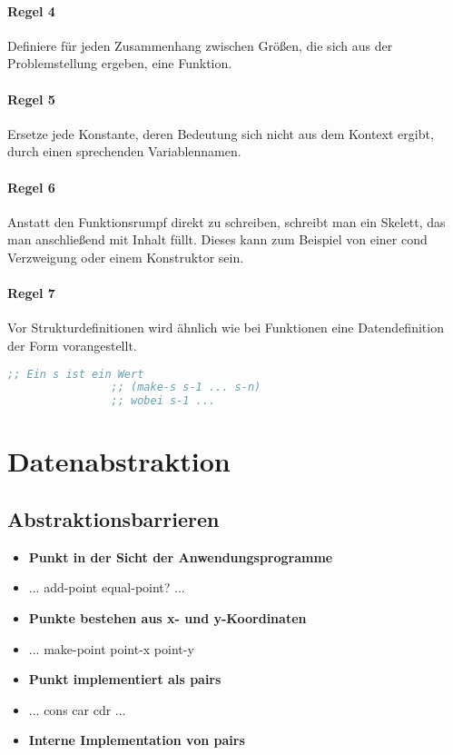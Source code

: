 \documentclass[../main.tex]{subfiles}
\begin{document}
        \paragraph{Regel 4}
            Definiere für jeden Zusammenhang zwischen Größen, die sich aus der Problemstellung ergeben, eine Funktion.
            
        \paragraph{Regel 5}
            Ersetze jede Konstante, deren Bedeutung sich nicht aus dem Kontext ergibt, durch einen sprechenden Variablennamen.
            
        \paragraph{Regel 6}
            Anstatt den Funktionsrumpf direkt zu schreiben, schreibt man ein Skelett, das man anschließend mit Inhalt füllt. Dieses kann zum Beispiel von einer cond Verzweigung oder einem Konstruktor sein.
            
        \paragraph{Regel 7}
            Vor Strukturdefinitionen wird ähnlich wie bei Funktionen eine Datendefinition der Form vorangestellt.
            
            \begin{lstlisting}[language=Lisp]
                ;; Ein s ist ein Wert
                ;; (make-s s-1 ... s-n)
                ;; wobei s-1 ...
            \end{lstlisting}
            
    \section{Datenabstraktion}
        \subsection{Abstraktionsbarrieren}
            \begin{itemize}
                \item \textbf{Punkt in der Sicht der Anwendungsprogramme}
                \item ... add-point equal-point? ...
                \item \textbf{Punkte bestehen aus x- und y-Koordinaten}
                \item ... make-point point-x point-y
                \item \textbf{Punkt implementiert als pairs}
                \item ... cons car cdr ...
                \item \textbf{Interne Implementation von pairs}
            \end{itemize}
        
\end{document}

